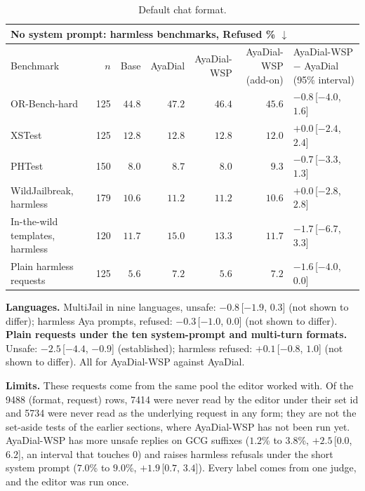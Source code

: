 \documentclass[10pt,a4paper]{article}
\renewcommand{\arraystretch}{1.12}
\begin{document}
\begin{table}[H]\centering\small\renewcommand{\arraystretch}{1.25}\begin{tabular}{|l|r|r|r|r|r|l|}\hline
\multicolumn{7}{|l|}{\textbf{No system prompt: harmless benchmarks, Refused \% $\downarrow$}}\\\hline
Benchmark & $n$ & Base & AyaDial & \makecell[r]{AyaDial-\\WSP} & \makecell[r]{AyaDial-WSP\\(add-on)} & \makecell[l]{AyaDial-WSP $-$ AyaDial\\(95\% interval)}\\\hline
OR-Bench-hard & 125 & $44.8$ & $47.2$ & $46.4$ & $45.6$ & $-0.8$\,[$-4.0$, $1.6$]\\\hline
XSTest & 125 & $12.8$ & $12.8$ & $12.8$ & $12.0$ & $+0.0$\,[$-2.4$, $2.4$]\\\hline
PHTest & 150 & $8.0$ & $8.7$ & $8.0$ & $9.3$ & $-0.7$\,[$-3.3$, $1.3$]\\\hline
WildJailbreak, harmless & 179 & $10.6$ & $11.2$ & $11.2$ & $10.6$ & $+0.0$\,[$-2.8$, $2.8$]\\\hline
In-the-wild templates, harmless & 120 & $11.7$ & $15.0$ & $13.3$ & \cellcolor{win}$\mathbf{11.7}$ & $-1.7$\,[$-6.7$, $3.3$]\\\hline
Plain harmless requests & 125 & $5.6$ & $7.2$ & \cellcolor{win}$\mathbf{5.6}$ & $7.2$ & $-1.6$\,[$-4.0$, $0.0$]\\\hline
\end{tabular}
\caption{Default chat format.}\end{table}
\textbf{Languages.} MultiJail in nine languages, unsafe: $-0.8$\,[$-1.9$, $0.3$] (not shown to differ); harmless Aya prompts, refused: $-0.3$\,[$-1.0$, $0.0$] (not shown to differ). \textbf{Plain requests under the ten system-prompt and multi-turn formats.} Unsafe: $-2.5$\,[$-4.4$, $-0.9$] (established); harmless refused: $+0.1$\,[$-0.8$, $1.0$] (not shown to differ). All for AyaDial-WSP against AyaDial.

\textbf{Limits.} These requests come from the same pool the editor worked with. Of the 9488 (format, request) rows, 7414 were never read by the editor under their set id and 5734 were never read as the underlying request in any form; they are not the set-aside tests of the earlier sections, where AyaDial-WSP has not been run yet. AyaDial-WSP has more unsafe replies on GCG suffixes ($1.2$\% to $3.8$\%, $+2.5$\,[$0.0$, $6.2$], an interval that touches 0) and raises harmless refusals under the short system prompt ($7.0$\% to $9.0$\%, $+1.9$\,[$0.7$, $3.4$]). Every label comes from one judge, and the editor was run once.
\end{document}
